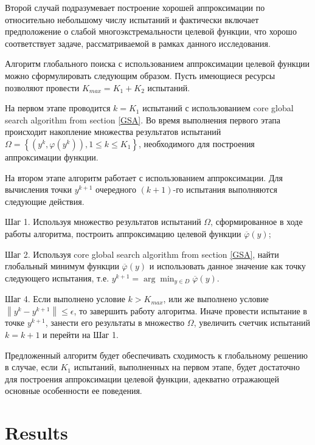 \documentclass[sensors,article,submit,moreauthors,pdftex]{Definitions/mdpi}
\begin{document}
Второй случай подразумевает построение хорошей аппроксимации по относительно небольшому числу испытаний и фактически включает предположение о слабой многоэкстремальности целевой функции, что хорошо соответствует задаче, рассматриваемой в рамках данного исследования.

Алгоритм глобального поиска с использованием аппроксимации целевой функции можно сформулировать следующим образом. 
Пусть имеющиеся ресурсы позволяют провести $K_{max} = K_1 + K_2$ испытаний. 

На первом этапе проводится $k = K_1$ испытаний с использованием core global search algorithm from section \ref{GSA}.
Во время выполнения первого этапа происходит накопление множества результатов испытаний $\Omega = \left\{(y^k, \varphi(y^k)), 1\leq k\leq K_1\right\}$, необходимого для построения аппроксимации функции.

На втором этапе алгоритм работает с использованием аппроксимации. Для вычисления точки $y^{k+1}$ очередного $(k+1)$-го испытания выполняются следующие действия.

Шаг 1. Используя множество результатов испытаний $\Omega$, сформированное в ходе работы алгоритма, построить аппроксимацию целевой функции $\overline{\varphi}(y)$;

Шаг 2. Используя core global search algorithm from section \ref{GSA}, найти глобальный минимум функции $\overline{\varphi}(y)$ и использовать данное значение как точку следующего испытания, т.е. $y^{k+1} = \arg \min_{y \in D} \overline{\varphi}(y)$.

Шаг 4. Если выполнено условие $k>K_{max}$, или же выполнено условие $\left\|y^k - y^{k+1}\right\| \leq \epsilon$, то завершить работу алгоритма. 
Иначе провести испытание в точке $y^{k+1}$, занести его результаты в множество $\Omega$, увеличить счетчик испытаний $k = k+1$ и перейти на Шаг 1.

Предложенный алгоритм будет обеспечивать сходимость к глобальному решению в случае, если $K_1$ испытаний, выполненных на первом этапе, будет достаточно для построения аппроксимации целевой функции, адекватно отражающей основные особенности ее поведения. 


\section{Results}
\end{document}
